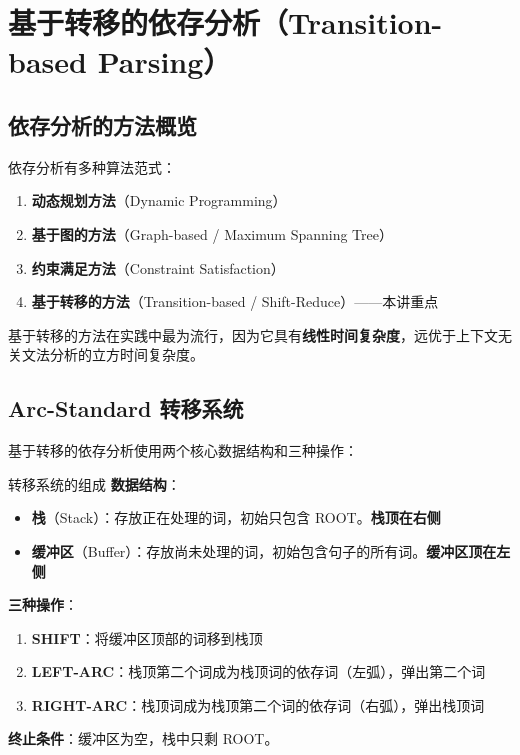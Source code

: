 \documentclass[a4paper]{article}
\begin{document}
\section{基于转移的依存分析（Transition-based Parsing）}

\subsection{依存分析的方法概览}

依存分析有多种算法范式：

\begin{enumerate}
    \item \textbf{动态规划方法}（Dynamic Programming）
    \item \textbf{基于图的方法}（Graph-based / Maximum Spanning Tree）
    \item \textbf{约束满足方法}（Constraint Satisfaction）
    \item \textbf{基于转移的方法}（Transition-based / Shift-Reduce）——本讲重点
\end{enumerate}

基于转移的方法在实践中最为流行，因为它具有\textbf{线性时间复杂度}，远优于上下文无关文法分析的立方时间复杂度。

\subsection{Arc-Standard 转移系统}

基于转移的依存分析使用两个核心数据结构和三种操作：

\begin{importantbox}{转移系统的组成}
\textbf{数据结构}：
\begin{itemize}
    \item \textbf{栈}（Stack）：存放正在处理的词，初始只包含 ROOT。\textbf{栈顶在右侧}
    \item \textbf{缓冲区}（Buffer）：存放尚未处理的词，初始包含句子的所有词。\textbf{缓冲区顶在左侧}
\end{itemize}

\textbf{三种操作}：
\begin{enumerate}
    \item \textbf{SHIFT}：将缓冲区顶部的词移到栈顶
    \item \textbf{LEFT-ARC}：栈顶第二个词成为栈顶词的依存词（左弧），弹出第二个词
    \item \textbf{RIGHT-ARC}：栈顶词成为栈顶第二个词的依存词（右弧），弹出栈顶词
\end{enumerate}

\textbf{终止条件}：缓冲区为空，栈中只剩 ROOT。
\end{importantbox}
\end{document}
